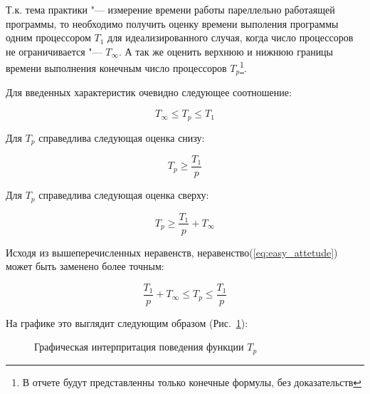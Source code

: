 \documentclass{article}
\begin{document}
			Т.к. тема практики "--- измерение времени работы пареллельно работаящей программы, то необходимо получить оценку    			времени выполения программы одним процессором $T_1$  для идеализированного случая, когда число процессоров не 						ограничивается "--- $T_\infty$. А так же оценить верхнюю и нижнюю границы времени выполнения конечным число процессоров 			$T_p$\footnote{В отчете будут представленны только конечные формулы, без доказательств}.
						
			Для введенных характеристик очевидно следующее соотношение:

			\begin{equation}
				\label{eq:easy_attetude}
				T_\infty \le T_p \le T_1
			\end{equation}
			
			Для $T_p$ справедлива следующая оценка снизу:
			
			\begin{equation}
				\label{eq:lower_bound}
				T_p \ge \frac{T_1}{p}
			\end{equation}
			
			Для $T_p$ справедлива следующая оценка сверху:
			
			\begin{equation}
				\label{eq:upper_bound}
				T_p \ge \frac{T_1}{p} + T_\infty
			\end{equation}
			
			Исходя из вышеперечисленных неравенств, неравенство(\ref{eq:easy_attetude}) может быть заменено более точным:
			
			\begin{equation}
				\label{eq:attetude}
				\frac{T_1}{p} + T_\infty \le T_p \le \frac{T_1}{p}
			\end{equation}
			
			\newpage

			На графике это выглядит следующим образом (Рис.~\ref{ris:graph_attetude}):
			
			\begin{figure}[h!]
				\caption{Графическая интерпритация поведения функции $T_p$}
				\label{ris:graph_attetude}
			\end{figure}
						
\end{document}
